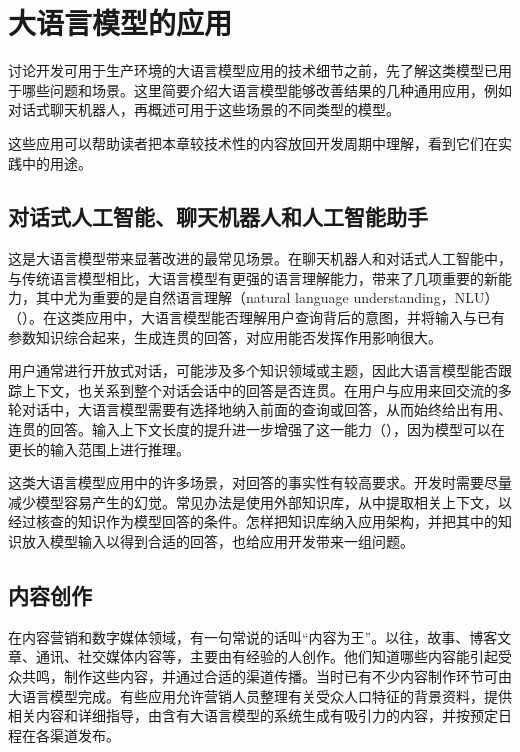 \section{大语言模型的应用}
\label{sec:ch08-applications}
讨论开发可用于生产环境的大语言模型应用的技术细节之前，先了解这类模型已用于哪些问题和场景。这里简要介绍大语言模型能够改善结果的几种通用应用，例如对话式聊天机器人，再概述可用于这些场景的不同类型的模型。

这些应用可以帮助读者把本章较技术性的内容放回开发周期中理解，看到它们在实践中的用途。

\subsection{对话式人工智能、聊天机器人和人工智能助手}
这是大语言模型带来显著改进的最常见场景。在聊天机器人和对话式人工智能中，与传统语言模型相比，大语言模型有更强的语言理解能力，带来了几项重要的新能力，其中尤为重要的是自然语言理解（natural language understanding，NLU）（）。在这类应用中，大语言模型能否理解用户查询背后的意图，并将输入与已有参数知识综合起来，生成连贯的回答，对应用能否发挥作用影响很大。

用户通常进行开放式对话，可能涉及多个知识领域或主题，因此大语言模型能否跟踪上下文，也关系到整个对话会话中的回答是否连贯。在用户与应用来回交流的多轮对话中，大语言模型需要有选择地纳入前面的查询或回答，从而始终给出有用、连贯的回答。输入上下文长度的提升进一步增强了这一能力（），因为模型可以在更长的输入范围上进行推理。

\begin{keypoint}
这类大语言模型应用中的许多场景，对回答的事实性有较高要求。开发时需要尽量减少模型容易产生的幻觉。常见办法是使用外部知识库，从中提取相关上下文，以经过核查的知识作为模型回答的条件。怎样把知识库纳入应用架构，并把其中的知识放入模型输入以得到合适的回答，也给应用开发带来一组问题。
\end{keypoint}

\subsection{内容创作}
在内容营销和数字媒体领域，有一句常说的话叫“内容为王”。以往，故事、博客文章、通讯、社交媒体内容等，主要由有经验的人创作。他们知道哪些内容能引起受众共鸣，制作这些内容，并通过合适的渠道传播。当时已有不少内容制作环节可由大语言模型完成。有些应用允许营销人员整理有关受众人口特征的背景资料，提供相关内容和详细指导，由含有大语言模型的系统生成有吸引力的内容，并按预定日程在各渠道发布。

